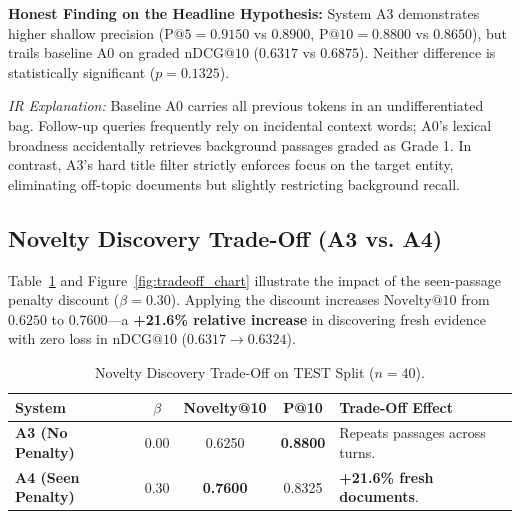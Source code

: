 \documentclass[10pt,a4paper,twocolumn]{article}
\begin{document}
\textbf{Honest Finding on the Headline Hypothesis:} System A3 demonstrates higher shallow precision ($\text{P@5} = 0.9150$ vs $0.8900$, $\text{P@10} = 0.8800$ vs $0.8650$), but trails baseline A0 on graded $\text{nDCG@10}$ ($0.6317$ vs $0.6875$). Neither difference is statistically significant ($p = 0.1325$). 

\textit{IR Explanation:} Baseline A0 carries all previous tokens in an undifferentiated bag. Follow-up queries frequently rely on incidental context words; A0's lexical broadness accidentally retrieves background passages graded as Grade 1. In contrast, A3's hard title filter strictly enforces focus on the target entity, eliminating off-topic documents but slightly restricting background recall.

\subsection{Novelty Discovery Trade-Off (A3 vs. A4)}
Table~\ref{tab:novelty_tradeoff} and Figure~\ref{fig:tradeoff_chart} illustrate the impact of the seen-passage penalty discount ($\beta = 0.30$). Applying the discount increases $\text{Novelty@10}$ from $0.6250$ to $0.7600$---a \textbf{+21.6\% relative increase} in discovering fresh evidence with zero loss in $\text{nDCG@10}$ ($0.6317 \to 0.6324$).

\begin{table}[H]
\centering
\scriptsize
\caption{Novelty Discovery Trade-Off on TEST Split ($n=40$).}
\label{tab:novelty_tradeoff}
\begin{tabularx}{\columnwidth}{l c c c X}
\toprule
\textbf{System} & \textbf{$\beta$} & \textbf{Novelty@10} & \textbf{P@10} & \textbf{Trade-Off Effect} \\
\midrule
\textbf{A3 (No Penalty)} & 0.00 & 0.6250 & \textbf{0.8800} & Repeats passages across turns. \\
\textbf{A4 (Seen Penalty)} & 0.30 & \textbf{0.7600} & 0.8325 & \textbf{+21.6\% fresh documents}. \\
\bottomrule
\end{tabularx}
\end{table}
\end{document}
